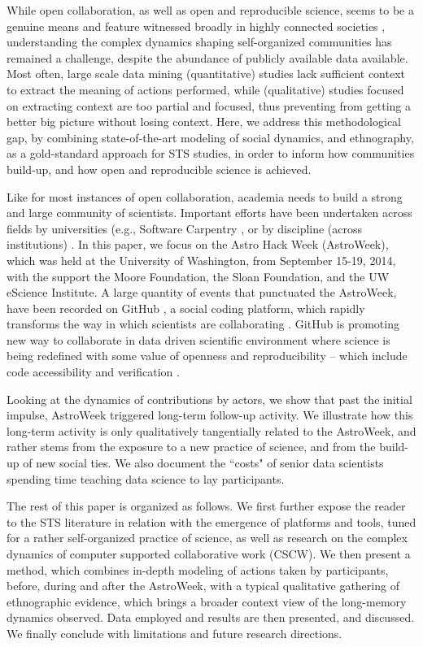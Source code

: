 While open collaboration, as well as open and reproducible science, seems to be a genuine means and feature witnessed broadly in highly connected societies  \cite{benkler2011penguin}, understanding the complex dynamics shaping self-organized communities has remained a challenge, despite the abundance of publicly available data available. Most often, large scale data mining (quantitative) studies lack sufficient context to extract the meaning of actions performed, while (qualitative) studies focused on extracting context are too partial and focused, thus preventing from getting a better big picture without losing context. Here, we address this methodological gap, by combining state-of-the-art modeling of social dynamics, and ethnography, as a gold-standard approach for STS studies, in order to inform how communities build-up, and how open and reproducible science is achieved.

Like for most instances of open collaboration, academia needs to build a strong and large community of scientists. Important efforts have been undertaken across fields by universities (e.g., Software Carpentry \cite{software_carpentry}, or by discipline (across institutions) \cite{calvert2013collaboration}. In this paper, we focus on the Astro Hack Week (AstroWeek), which was held at the University of Washington, from September 15-19, 2014, with the support the Moore Foundation, the Sloan Foundation, and the UW eScience Institute. A large quantity of events that punctuated the AstroWeek, have been recorded on GitHub \cite{github}, a social coding platform, which rapidly transforms the way in which scientists are collaborating \cite{gerson2013integration}. GitHub is promoting new way to collaborate in data driven scientific environment where science is being redefined with some value of openness and reproducibility \cite{ducheneaut2005socialization} -- which include code accessibility  and verification \cite{hayden2015rule,proebsting2015repeatability}.

Looking at the dynamics of contributions by actors, we show that past the initial impulse, AstroWeek triggered long-term follow-up activity. We illustrate how this long-term activity is only qualitatively tangentially related to the AstroWeek, and rather stems from the exposure to a new practice of science, and from the build-up of new social ties. We also document the ``costs"  of senior data scientists spending time teaching data science to lay participants.

The rest of this paper is organized as follows. We first further expose the reader to the STS literature in relation with the emergence of platforms and tools, tuned for a rather self-organized practice of science, as well as research on the complex dynamics of computer supported collaborative work (CSCW). We then present a method, which combines in-depth modeling of actions taken by participants, before, during and after the AstroWeek, with a typical qualitative gathering of ethnographic evidence, which brings a broader context view of the long-memory dynamics observed. Data employed and results are then presented, and discussed. We finally conclude with limitations and future research directions.

